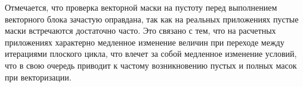 \documentclass[a4paper,14pt]{extarticle}                     %
\theoremstyle{plain}                                         %
\begin{document}


Отмечается, что проверка векторной маски на пустоту перед выполнением векторного блока зачастую оправдана, так как на реальных приложениях пустые маски встречаются достаточно часто.
Это связано с тем, что на расчетных приложениях характерно медленное изменение величин при переходе между итерациями плоского цикла, что влечет за собой медленное изменение условий, что в свою очередь приводит к частому возникновению пустых и полных масок при векторизации.

\end{document}
